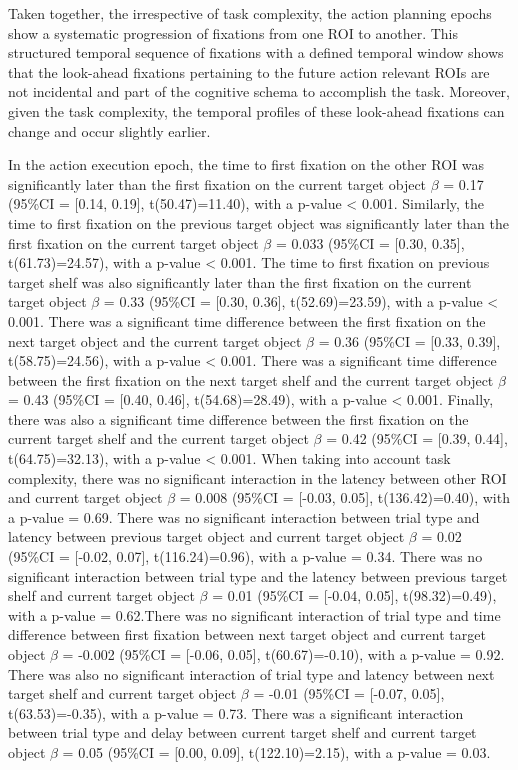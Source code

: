 Taken together, the irrespective of task complexity, the action planning epochs show a systematic progression of fixations from one ROI to another. This structured temporal sequence of fixations with a defined temporal window shows that the look-ahead fixations pertaining to the future action relevant ROIs are not incidental and part of the cognitive schema to accomplish the task. Moreover, given the task complexity, the temporal profiles of these look-ahead fixations can change and occur slightly earlier.

In the action execution epoch, the time to first fixation on the other ROI was significantly later than the first fixation on the current target object $\beta$ = 0.17 (95\%CI = [0.14, 0.19], t(50.47)=11.40), with a p-value < 0.001. Similarly, the time to first fixation on the previous target object was significantly later than the first fixation on the current target object $\beta$ = 0.033 (95\%CI = [0.30, 0.35], t(61.73)=24.57), with a p-value < 0.001. The time to first fixation on previous target shelf was also significantly later than the first fixation on the current target object $\beta$ = 0.33 (95\%CI = [0.30, 0.36], t(52.69)=23.59), with a p-value < 0.001. There was a significant time difference between the first fixation on the next target object and the current target object $\beta$ = 0.36 (95\%CI = [0.33, 0.39], t(58.75)=24.56), with a p-value < 0.001. There was a significant time difference between the first fixation on the next target shelf and the current target object $\beta$ = 0.43 (95\%CI = [0.40, 0.46], t(54.68)=28.49), with a p-value < 0.001. Finally, there was also a significant time difference between the first fixation on the current target shelf and the current target object $\beta$ = 0.42 (95\%CI = [0.39, 0.44], t(64.75)=32.13), with a p-value < 0.001. When taking into account task complexity, there was no significant interaction in the latency between other ROI and current target object $\beta$ = 0.008 (95\%CI = [-0.03, 0.05], t(136.42)=0.40), with a p-value = 0.69. There was no significant interaction between trial type and latency between previous target object and current target object $\beta$ = 0.02 (95\%CI = [-0.02, 0.07], t(116.24)=0.96), with a p-value = 0.34. There was no significant interaction between trial type and the latency between previous target shelf and current target object $\beta$ = 0.01 (95\%CI = [-0.04, 0.05], t(98.32)=0.49), with a p-value = 0.62.There was no significant interaction of trial type and time difference between first fixation between next target object and current target object $\beta$ = -0.002 (95\%CI = [-0.06, 0.05], t(60.67)=-0.10), with a p-value = 0.92. There was also no significant interaction of trial type and latency between next target shelf and current target object $\beta$ = -0.01 (95\%CI = [-0.07, 0.05], t(63.53)=-0.35), with a p-value = 0.73. There was a significant interaction between trial type and delay between current target shelf and current target object $\beta$ = 0.05 (95\%CI = [0.00, 0.09], t(122.10)=2.15), with a p-value = 0.03.

